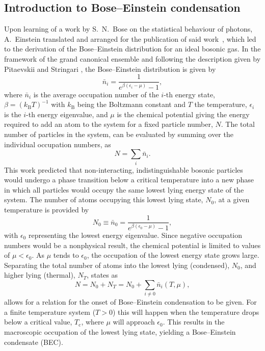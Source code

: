 \subsection{Introduction to Bose--Einstein condensation}\label{sub:becintro}
Upon learning of a work by S.~N.~Bose on the statistical behaviour of photons, A.~Einstein translated and arranged for the publication of said work~\cite{Einstein_bec_1925}, which led to the derivation of the Bose--Einstein distribution for an ideal bosonic gas. In the framework of the grand canonical ensemble and following the description given by Pitaevskii and Stringari \cite[chap. 2]{BK:Pitaevskii_Stringari_2003}, the Bose--Einstein distribution is given by
\begin{equation}
\bar{n}_i = \frac{1}{e^{\beta(\epsilon_i - \mu)} -1},
\end{equation}
where $\bar{n}_i$ is the average occupation number of the $i$-th energy state, $\beta=(k_{\textrm{B}}T)^{-1}$ with $k_{\textrm{B}}$ being the Boltzmann constant and $T$ the temperature, $\epsilon_i$ is the $i$-th energy eigenvalue, and $\mu$ is the chemical potential giving the energy required to add an atom to the system for a fixed particle number, $N$. The total number of particles in the system, can be evaluated by summing over the individual occupation numbers, as
\begin{equation}
N=\displaystyle\sum_i \bar{n}_i.
\end{equation}
This work predicted that non-interacting, indistinguishable bosonic particles would undergo a phase transition below a critical temperature into a new phase in which all particles would occupy the same lowest lying energy state of the system. The number of atoms occupying this lowest lying state, $N_0$, at a given temperature is provided by
\begin{equation}
N_0 \equiv \bar{n}_0 = \frac{1}{e^{\beta(\epsilon_0 - \mu)} - 1},
\end{equation}
with $\epsilon_0$ representing the lowest energy eigenvalue. Since negative occupation numbers would be a nonphysical result, the chemical potential is limited to values of $\mu < \epsilon_0$. As $\mu$ tends to $\epsilon_0$, the occupation of the lowest energy state grows large. Separating the total number of atoms into the lowest lying (condensed), $N_0$, and higher lying (thermal), $N_T$, states as
\begin{equation}
N = N_0 + N_T = N_0 + \displaystyle\sum_{i\neq 0}\bar{n}_i(T,\mu),
\end{equation}
allows for a relation for the onset of Bose--Einstein condensation to be given. For a finite temperature system ($T>0$) this will happen when the temperature drops below a critical value, $T_{\textrm{c}}$, where $\mu$ will approach $\epsilon_0$. This results in the macroscopic occupation of the lowest lying state, yielding a Bose--Einstein condensate (BEC).

